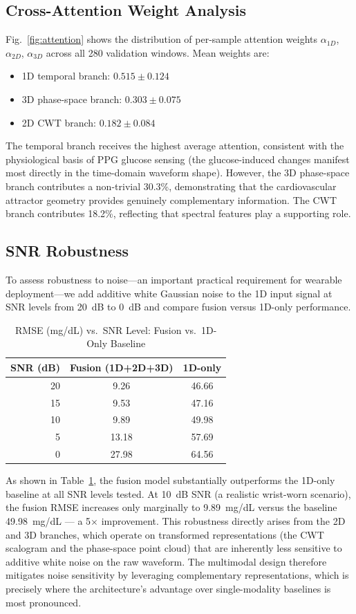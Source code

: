\documentclass[conference]{IEEEtran}
\begin{document}
\subsection{Cross-Attention Weight Analysis}
Fig.~\ref{fig:attention} shows the distribution of per-sample attention weights
$\alpha_{1D}$, $\alpha_{2D}$, $\alpha_{3D}$ across all 280 validation windows.
Mean weights are:
\begin{itemize}
  \item 1D temporal branch: $0.515 \pm 0.124$
  \item 3D phase-space branch: $0.303 \pm 0.075$
  \item 2D CWT branch: $0.182 \pm 0.084$
\end{itemize}
The temporal branch receives the highest average attention, consistent with
the physiological basis of PPG glucose sensing (the glucose-induced changes
manifest most directly in the time-domain waveform shape).  However, the
3D phase-space branch contributes a non-trivial 30.3\%, demonstrating that
the cardiovascular attractor geometry provides genuinely complementary
information.  The CWT branch contributes 18.2\%, reflecting that spectral
features play a supporting role.

\subsection{SNR Robustness}
To assess robustness to noise---an important practical requirement for
wearable deployment---we add additive white Gaussian noise to the 1D input
signal at SNR levels from 20~dB to 0~dB and compare fusion versus 1D-only
performance.

\begin{table}[htbp]
  \caption{RMSE (mg/dL) vs.\ SNR Level: Fusion vs.\ 1D-Only Baseline}
  \label{tab:snr}
  \centering
  \begin{tabular}{rcc}
    \toprule
    \textbf{SNR (dB)} & \textbf{Fusion (1D+2D+3D)} & \textbf{1D-only} \\
    \midrule
    20  & 9.26  & 46.66 \\
    15  & 9.53  & 47.16 \\
    10  & 9.89  & 49.98 \\
     5  & 13.18 & 57.69 \\
     0  & 27.98 & 64.56 \\
    \bottomrule
  \end{tabular}
\end{table}

As shown in Table~\ref{tab:snr}, the fusion model substantially outperforms
the 1D-only baseline at all SNR levels tested.  At 10~dB SNR (a realistic
wrist-worn scenario), the fusion RMSE increases only marginally to
9.89~mg/dL versus the baseline 49.98~mg/dL --- a 5$\times$ improvement.
This robustness directly arises from the 2D and 3D branches, which operate on
transformed representations (the CWT scalogram and the phase-space point cloud)
that are inherently less sensitive to additive white noise on the raw waveform.
The multimodal design therefore mitigates noise sensitivity by leveraging
complementary representations, which is precisely where the architecture's
advantage over single-modality baselines is most pronounced.
\end{document}
